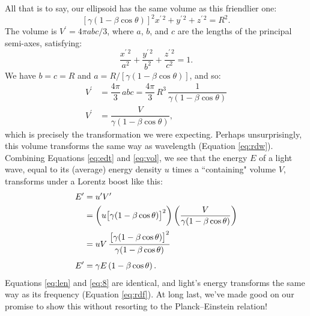 \documentclass[12pt]{article}
\begin{document}
All that is to say, our ellipsoid has the same volume as this friendlier one:
\begin{equation*}
\left[ \gamma ( 1 - \beta \cos{\theta} ) \right]^2 x^{\prime \, 2} + y^{\prime \, 2} + z^{\prime \, 2} = R^2 .
\end{equation*}
The volume is $V^\prime = 4 \pi abc / 3$, where $a$, $b$, and $c$ are the lengths of the principal semi-axes, satisfying:
\begin{equation*}
\dfrac{x^{\prime \, 2}}{a^2} + \dfrac{y^{\prime \, 2}}{b^2} + \dfrac{z^{\prime \, 2}}{c^2} = 1 .
\end{equation*}
We have $b = c = R$ and $a = R / [\gamma ( 1 - \beta \cos{\theta} )]$, and so:
\begin{equation}\label{eq:vol}
\begin{split}
V^\prime &= \dfrac{4 \pi}{3} \, abc = \dfrac{4 \pi }{3} \, R^3 \, \dfrac{1}{\gamma \left( 1 - \beta \cos{\theta} \right)} \\
V^\prime &= \dfrac{V}{\gamma \left( 1 - \beta \cos{\theta} \right)} ,
\end{split}
\end{equation}
which is precisely the transformation we were expecting. Perhaps unsurprisingly, this volume transforms the same way as wavelength (Equation \ref{eq:rdw}). Combining Equations \ref{eq:edt} and \ref{eq:vol}, we see that the energy $E$ of a light wave, equal to its (average) energy density $u$ times a ``containing" volume $V$, transforms under a Lorentz boost like this:
\begin{equation}\label{eq:len}
\begin{split}
E^\prime &= u^\prime V^\prime \\
&= \bigg( u \big[ \gamma ( 1 - \beta \cos{\theta} ) \big]^2  \bigg) \left( \dfrac{V}{\gamma ( 1 - \beta \cos{\theta} )} \right) \\[2pt]
&= uV \, \dfrac{ \mathstrut_{\mathstrut_{\mathstrut}} \mkern-1mu \bigl[ \gamma ( 1 - \beta \cos{\theta} ) \bigr]^2}{\gamma ( 1 - \beta \cos{\theta} )} \\[4pt]
E^\prime &= \gamma E \left( 1 - \beta \cos{\theta} \right) .
\end{split}
\end{equation}
Equations \ref{eq:len} and \ref{eq:8} are identical, and light's energy transforms the same way as its frequency (Equation \ref{eq:rdf}). At long last, we've made good on our promise to show this without resorting to the Planck--Einstein relation!
\end{document}
